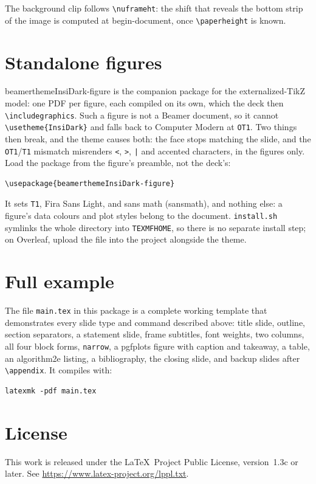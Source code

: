 \documentclass[a4paper,11pt]{article}
\begin{document}
The background clip follows \verb|\nuframeht|: the shift that reveals the
bottom strip of the image is computed at begin-document, once
\verb|\paperheight| is known.

\section{Standalone figures}
\label{sec:figure}

\textsf{beamerthemeInsiDark-figure} is the companion package for the
externalized-TikZ model: one PDF per figure, each compiled on its own, which
the deck then \verb|\includegraphics|.  Such a figure is not a Beamer document,
so it cannot \verb|\usetheme{InsiDark}| and falls back to Computer Modern at
\texttt{OT1}.  Two things then break, and the theme causes both: the face stops
matching the slide, and the \texttt{OT1}/\texttt{T1} mismatch misrenders
\texttt{<}, \texttt{>}, \texttt{|} and accented characters, in the figures
only.  Load the package from the figure's preamble, not the deck's:

\begin{lstlisting}
\usepackage{beamerthemeInsiDark-figure}
\end{lstlisting}

It sets \texttt{T1}, Fira Sans Light, and sans math (\textsf{sansmath}), and
nothing else: a figure's data colours and plot styles belong to the document.
\texttt{install.sh} symlinks the whole directory into \texttt{TEXMFHOME}, so
there is no separate install step; on Overleaf, upload the file into the
project alongside the theme.

\section{Full example}

The file \texttt{main.tex} in this package is a complete working template that
demonstrates every slide type and command described above: title slide,
outline, section separators, a statement slide, frame subtitles, font weights,
two columns, all four block forms, \texttt{narrow}, a \textsf{pgfplots} figure
with caption and takeaway, a table, an \textsf{algorithm2e} listing, a
bibliography, the closing slide, and backup slides after \verb|\appendix|.  It
compiles with:

\begin{lstlisting}
latexmk -pdf main.tex
\end{lstlisting}

\section{License}

This work is released under the \LaTeX\ Project Public License,
version~1.3c or later.
See \url{https://www.latex-project.org/lppl.txt}.
\end{document}
